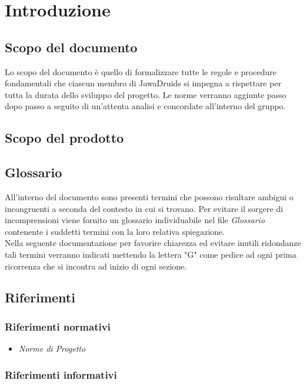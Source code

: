 \chapter{Introduzione}

\section{Scopo del documento}
Lo scopo del documento è quello di formalizzare tutte le regole e procedure fondamentali che ciascun membro di JawaDruids si impegna a rispettare per tutta la durata dello sviluppo del progetto. 
Le norme verranno aggiunte passo dopo passo a seguito di un'attenta analisi e concordate all'interno del gruppo. 
\section{Scopo del prodotto}

\section{Glossario}
All'interno del documento sono presenti termini che possono risultare ambigui o incongruenti a seconda del contesto in cui si trovano. Per evitare il sorgere di incomprensioni viene fornito un glossario individuabile nel file \textit{Glossario} contenente i suddetti termini con la loro relativa spiegazione.
\\Nella seguente documentazione per favorire chiarezza ed evitare inutili ridondanze tali termini verranno indicati mettendo la lettera "G" come pedice ad ogni prima ricorrenza che si incontra ad inizio di ogni sezione.

\section{Riferimenti}
\subsection{Riferimenti normativi}
\begin{itemize}
	\item \textit{Norme di Progetto}
\end{itemize}
\subsection{Riferimenti informativi}
\begin{itemize}
	
\end{itemize}